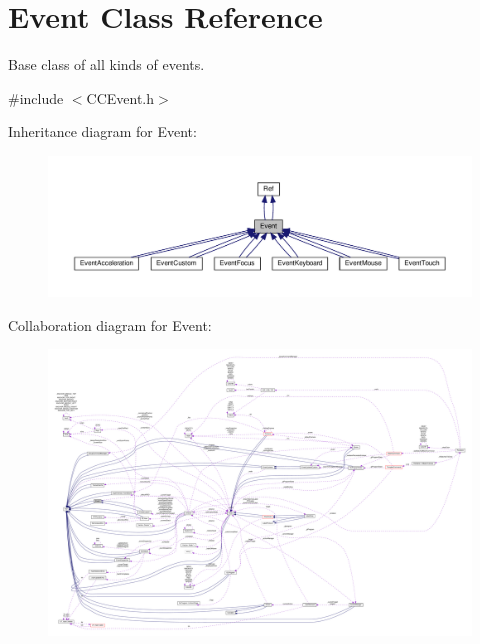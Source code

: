 \hypertarget{classEvent}{}\section{Event Class Reference}
\label{classEvent}


Base class of all kinds of events.  




{\ttfamily \#include $<$C\+C\+Event.\+h$>$}



Inheritance diagram for Event\+:
\nopagebreak
\begin{figure}[H]
\begin{center}
\leavevmode
\includegraphics[width=350pt]{classEvent__inherit__graph}
\end{center}
\end{figure}


Collaboration diagram for Event\+:
\nopagebreak
\begin{figure}[H]
\begin{center}
\leavevmode
\includegraphics[width=350pt]{classEvent__coll__graph}
\end{center}
\end{figure}
